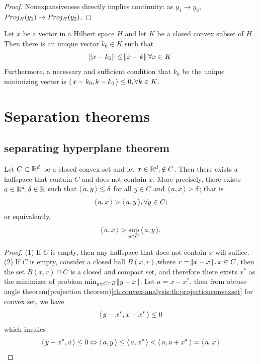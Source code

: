 \begin{refsection}
\begin{proof}
Nonexpansiveness directly implies continuity: as $y_1\to y_2$, $Proj_{\mathcal{X}}(y_1) \to Proj_{\mathcal{X}}(y_2)$.
\end{proof}






\begin{theorem}\cite[69]{luenberger1969optimization}
	Let $x$ be a vector in a Hilbert space $H$ and let $K$ be a closed convex subset of $H$. Then there is an unique vector $k_0 \in K$ such that 
	$$\norm{x-k_0} \leq \norm{x - k} \forall x\in K $$
	Furthermore, a necessary and sufficient condition that $k_0$ be the unique minimizing vector is ${\left< \, x-k_0,k-k_0 \, \right>} \leq 0, \forall k\in K$.
\end{theorem}




\section{Separation theorems}


\subsection{separating hyperplane theorem}
\begin{theorem}\cite[170]{bertsimas1997introduction}\label{ch:convex-analysis:th:separatinghyperplane}
Let $C\subset \mathbb{R}^d$ be a closed convex set and let $x\in\mathbb{R}^d, \notin C$. Then there exists a halfspace that contain $C$ and does not contain $x$. More precisely, there exists $a\in \mathbb{R}^d, \delta \in \mathbb{R}$ such that ${\left< \, a,y \, \right>} \leq \delta$ for all $y\in C$ and ${\left< \, a,x \, \right>} > \delta$; that is 
$${\left< \, a,x \, \right>} > {\left< \, a,y \, \right>},\forall y\in C;$$
or equivalently,
$${\left< \, a,x \, \right>} > \sup_{y\in C}{\left< \, a,y \, \right>}.$$
\end{theorem}
\begin{proof}
(1) If $C$ is empty, then any halfspace that does not contain $x$ will suffice. (2) If $C$ is empty, consider a closed ball $B(x,r)$,where $r = \norm{x-\bar{x}},\bar{x}\in C$, then the set $B(x,r)\cap C$ is a closed and compact set, and therefore there exists $x^*$ as the minimizer of problem $\min_{y\in C\cap B}\norm{y-x}$. Let $a = x-x^*$, then from obtuse angle theorem(projection theorem)\autoref{ch:convex-analysis:th:projectionconvexset} for convex set, we have
$${\left< \, y-x^*,x-x^* \, \right>} \leq 0$$
which implies
$${\left< \, y-x^*,a \, \right>}\leq 0 \Leftrightarrow {\left< \, a,y \, \right>} \leq {\left< \, a,x^* \, \right>} < {\left< \, a,a + x^* \, \right>} = {\left< \, a,x \, \right>}$$
\end{proof}



\end{refsection}
